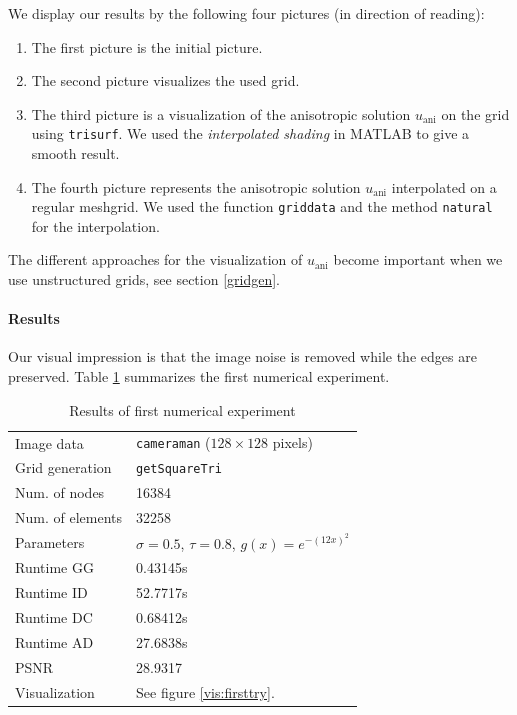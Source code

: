\documentclass{report}
\def\ani{\text{ani}}
\begin{document}
We display our results by the following four pictures (in direction of reading):
\begin{enumerate}
	\item 
	The first picture is the initial picture.
	\item
	The second picture visualizes the used grid.
	\item
	The third picture is a visualization of the anisotropic solution $u_\ani$ on the grid using \texttt{trisurf}. We used the \emph{interpolated shading} in MATLAB to give a smooth result.
	\item
	The fourth picture represents the anisotropic solution $u_\ani$ interpolated on a regular meshgrid. We used the function \texttt{griddata} and the method \texttt{natural} for the interpolation.
\end{enumerate}
The different approaches for the visualization of $u_\ani$ become important when we use unstructured grids, see section \ref{gridgen}.

\paragraph{Results}

Our visual impression is that the image noise is removed while the edges are preserved. Table \ref{res:firsttry} summarizes the first numerical experiment.

\begin{table}[h]
	\centering
	\begin{tabular}{|ll}
		Image data & \texttt{cameraman} ($128 \times 128$ pixels) \\
		Grid generation & \texttt{getSquareTri} \\
		Num. of nodes & 16384\\
		Num. of elements & 32258\\
		Parameters & $\sigma=0.5$, $\tau=0.8$, $g(x) = e^{-(12 x)^2}$ \\
		Runtime GG & 0.43145s \\
		Runtime ID & 52.7717s \\
		Runtime DC & 0.68412s \\
		Runtime AD & 27.6838s\\
		PSNR & 28.9317 \\
		Visualization & See figure \ref{vis:firsttry}. \\
	\end{tabular}
	\caption{Results of first numerical experiment}
	\label{res:firsttry}
\end{table}
\end{document}
